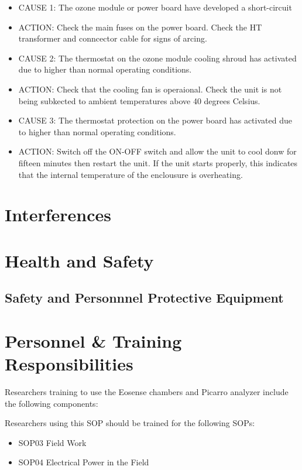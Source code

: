 \documentclass[12pt]{../SOP2}
\begin{document}
\begin{itemize}
  \item CAUSE 1: The ozone module or power board have developed a short-circuit
  \item ACTION: Check the main fuses on the power board. Check the HT transformer and conncector cable for signs of arcing. 
  \item CAUSE 2: The thermostat on the ozone module cooling shroud has activated due to higher than normal operating conditions.
  \item ACTION: Check that the cooling fan is operaional. Check the unit is not being subkected to ambient temperatures above 40 degrees Celsius.
  \item CAUSE 3: The thermostat protection on the power board has activated due to higher than normal operating conditions. 
  \item ACTION: Switch off the ON-OFF switch and allow the unit to cool donw for fifteen minutes then restart the unit. If the unit starts properly, this indicates that the internal temperature of the enclousure is overheating. 
\end{itemize}

\section{Interferences}

\section{Health and Safety}

\subsection{Safety and Personnnel Protective Equipment}


\section{Personnel \& Training Responsibilities}

Researchers training to use the Eosense chambers and Picarro analyzer include the following components: 



Researchers using this SOP should be trained for the following SOPs:

\begin{itemize}
  \item SOP03 Field Work
  \item SOP04 Electrical Power in the Field
\end{itemize}
\end{document}
